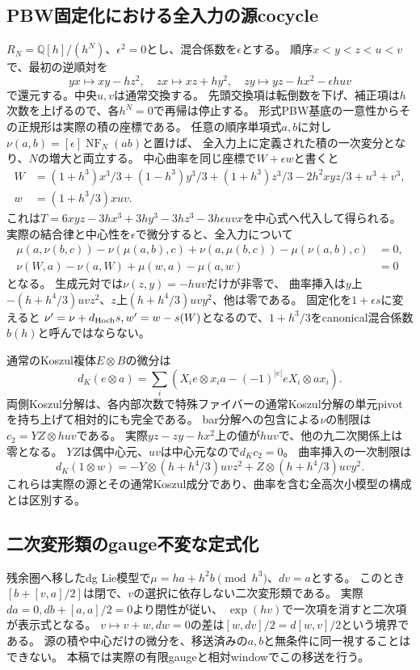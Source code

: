 \subsection{PBW固定化における全入力の源cocycle}
$R_N=\mathbb Q[h]/(h^N)$、$\epsilon^2=0$とし、混合係数を$\epsilon$とする。
順序$x<y<z<u<v$で、最初の逆順対を
\[
 yx\mapsto xy-hz^2,\quad zx\mapsto xz+hy^2,\quad
 zy\mapsto yz-hx^2-\epsilon huv
\]
で還元する。中央$u,v$は通常交換する。
先頭交換項は転倒数を下げ、補正項は$h$次数を上げるので、各$h^N=0$で再帰は停止する。
形式PBW基底の一意性からその正規形は実際の積の座標である。
任意の順序単項式$a,b$に対し$\nu(a,b)=[\epsilon]\operatorname{NF}_N(ab)$と置けば、
全入力上に定義された積の一次変分となり、$N$の増大と両立する。
中心曲率を同じ座標で$W+\epsilon w$と書くと
\begin{align*}
 W&=(1+h^3)x^3/3+(1-h^3)y^3/3+(1+h^3)z^3/3-2h^2xyz/3+u^3+v^3,\\
 w&=(1+h^3/3)xuv.
\end{align*}
これは$T=6xyz-3hx^3+3hy^3-3hz^3-3h\epsilon uvx$を中心式へ代入して得られる。
実際の結合律と中心性を$\epsilon$で微分すると、全入力について
\begin{align*}
 \mu(a,\nu(b,c))-\nu(\mu(a,b),c)+\nu(a,\mu(b,c))-\mu(\nu(a,b),c)&=0,\\
 \nu(W,a)-\nu(a,W)+\mu(w,a)-\mu(a,w)&=0
\end{align*}
となる。
生成元対では$\nu(z,y)=-huv$だけが非零で、
曲率挿入は$y$上$-(h+h^4/3)uvz^2$、$z$上$(h+h^4/3)uvy^2$、他は零である。
固定化を$1+\epsilon s$に変えると
$\nu' =\nu+d_{\rm Hoch}s,w'=w-s(W)$となるので、$1+h^3/3$をcanonical混合係数$b(h)$と呼んではならない。

通常のKoszul複体$E\otimes B$の微分\cite{Negron}は
\[
 d_K(e\otimes a)=\sum_i(X_ie\otimes x_ia-(-1)^{|e|}eX_i\otimes ax_i).
\]
両側Koszul分解は、各内部次数で特殊ファイバーの通常Koszul分解の単元pivotを持ち上げて相対的にも完全である。
bar分解への包含による$\nu$の制限は$c_2=YZ\otimes huv$である。
実際$yz-zy-hx^2$上の値が$huv$で、他の九二次関係上は零となる。
$YZ$は偶中心元、$uv$は中心元なので$d_Kc_2=0$。
曲率挿入の一次制限は
\[
 d_K(1\otimes w)=-Y\otimes(h+h^4/3)uvz^2+Z\otimes(h+h^4/3)uvy^2.
\]
これらは実際の源とその通常Koszul成分であり、曲率を含む全高次小模型の構成とは区別する。

\subsection{二次変形類のgauge不変な定式化}
残余圏へ移したdg Lie模型で$\mu=ha+h^2b\pmod{h^3}$、$dv=a$とする。
このとき$[b+[v,a]/2]$は閉で、$v$の選択に依存しない二次変形類である。
実際$da=0,db+[a,a]/2=0$より閉性が従い、
$\exp(hv)$で一次項を消すと二次項が表示式となる。
$v\mapsto v+w,dw=0$の差は$[w,dv]/2=d[w,v]/2$という境界である。
源の積や中心だけの微分を、移送済みの$a,b$と無条件に同一視することはできない。
本稿では実際の有限gaugeと相対windowでこの移送を行う。
